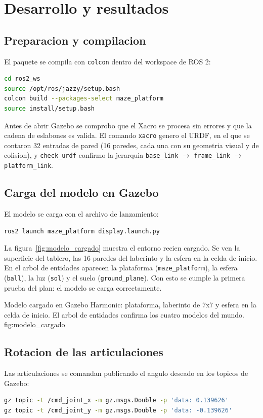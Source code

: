 \documentclass[11pt,a4paper]{article}
\begin{document}
\section{Desarrollo y resultados}

\subsection{Preparacion y compilacion}
El paquete se compila con \texttt{colcon} dentro del workspace de ROS 2:
\begin{lstlisting}[language=bash, caption={Compilacion del paquete.}]
cd ros2_ws
source /opt/ros/jazzy/setup.bash
colcon build --packages-select maze_platform
source install/setup.bash
\end{lstlisting}

Antes de abrir Gazebo se comprobo que el Xacro se procesa sin errores y que la cadena de eslabones es valida. El comando \texttt{xacro} genero el URDF, en el que se contaron 32 entradas de pared (16 paredes, cada una con su geometria visual y de colision), y \texttt{check\_urdf} confirmo la jerarquia \texttt{base\_link} $\rightarrow$ \texttt{frame\_link} $\rightarrow$ \texttt{platform\_link}.

\subsection{Carga del modelo en Gazebo}
El modelo se carga con el archivo de lanzamiento:
\begin{lstlisting}[language=bash, caption={Lanzamiento de Gazebo con el modelo.}]
ros2 launch maze_platform display.launch.py
\end{lstlisting}

La figura~\ref{fig:modelo_cargado} muestra el entorno recien cargado. Se ven la superficie del tablero, las 16 paredes del laberinto y la esfera en la celda de inicio. En el arbol de entidades aparecen la plataforma (\texttt{maze\_platform}), la esfera (\texttt{ball}), la luz (\texttt{sol}) y el suelo (\texttt{ground\_plane}). Con esto se cumple la primera prueba del plan: el modelo se carga correctamente.

{Modelo cargado en Gazebo Harmonic: plataforma, laberinto de 7x7 y esfera en la celda de inicio. El arbol de entidades confirma los cuatro modelos del mundo.}
{fig:modelo_cargado}

\subsection{Rotacion de las articulaciones}
Las articulaciones se comandan publicando el angulo deseado en los topicos de Gazebo:
\begin{lstlisting}[language=bash, caption={Comando de inclinacion de las articulaciones (8 grados = 0.1396 rad).}]
gz topic -t /cmd_joint_x -m gz.msgs.Double -p 'data: 0.139626'
gz topic -t /cmd_joint_y -m gz.msgs.Double -p 'data: -0.139626'
\end{lstlisting}
\end{document}
